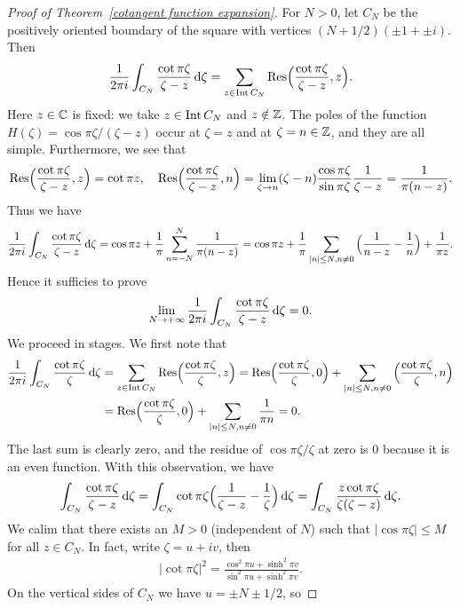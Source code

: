 \begin{proof}[Proof of Theorem~\ref{cotangent function expansion}]
For $N>0$, let $C_N$ be the positively oriented boundary of the square with vertices $(N+1/2)(\pm 1+\pm i)$. Then
\[\frac{1}{2\pi i}\int_{C_N}\frac{\cot\pi\zeta}{\zeta-z}\mathop{}\!\mathrm{d}\zeta=\sum_{z\in\mathrm{Int}\, C_N}\mathrm{Res}\Big(\frac{\cot\pi\zeta}{\zeta-z},z\Big).\]
Here $z\in\mathbb{C}$ is fixed: we take $z\in\mathrm{Int}\, C_N$ and $z\notin\mathbb{Z}$. The poles of the function $H(\zeta)=\cos\pi\zeta/(\zeta-z)$ occur at $\zeta=z$ and at $\zeta=n\in\mathbb{Z}$, and they are all simple. Furthermore, we see that
\[\mathrm{Res}\Big(\frac{\cot\pi\zeta}{\zeta-z},z\Big)=\cot\pi z,\quad \mathrm{Res}\Big(\frac{\cot\pi\zeta}{\zeta-z},n\Big)=\lim_{\zeta\to n}(\zeta-n)\frac{\cos\pi\zeta}{\sin\pi\zeta}\frac{1}{\zeta-z}=\frac{1}{\pi(n-z)}.\]
Thus we have
\[\frac{1}{2\pi i}\int_{C_N}\frac{\cot\pi\zeta}{\zeta-z}\mathop{}\!\mathrm{d}\zeta=\cos\pi z+\frac{1}{\pi}\sum_{n=-N}^{N}\frac{1}{\pi(n-z)}=\cos\pi z+\frac{1}{\pi}\sum_{|n|\leq N,n\neq 0}\Big(\frac{1}{n-z}-\frac{1}{n}\Big)+\frac{1}{\pi z}.\]
Hence it sufficies to prove
\begin{align}\label{cotangent function expansion-2}
\lim_{N\to+\infty}\frac{1}{2\pi i}\int_{C_N}\frac{\cot\pi\zeta}{\zeta-z}\mathop{}\!\mathrm{d}\zeta=0.
\end{align}
We proceed in stages. We first note that
\begin{align*}
\frac{1}{2\pi i}\int_{C_N}\frac{\cot\pi\zeta}{\zeta}\mathop{}\!\mathrm{d}\zeta&=\sum_{z\in\mathrm{Int}\, C_N}\mathrm{Res}\Big(\frac{\cot\pi\zeta}{\zeta},z\Big)=\mathrm{Res}\Big(\frac{\cot\pi\zeta}{\zeta},0\Big)+\sum_{|n|\leq N,n\neq 0}\Big(\frac{\cot\pi\zeta}{\zeta},n\Big)\\
&=\mathrm{Res}\Big(\frac{\cot\pi\zeta}{\zeta},0\Big)+\sum_{|n|\leq N,n\neq 0}\frac{1}{\pi n}=0.
\end{align*}
The last sum is clearly zero, and the residue of $\cos\pi\zeta/\zeta$ at zero is $0$ because it is an even function. With this observation, we have
\begin{align}\label{cotangent function expansion-3}
\int_{C_N}\frac{\cot\pi\zeta}{\zeta-z}\mathop{}\!\mathrm{d}\zeta=\int_{C_N}\cot\pi\zeta\Big(\frac{1}{\zeta-z}-\frac{1}{\zeta}\Big)\mathop{}\!\mathrm{d}\zeta=\int_{C_N}\frac{z\cot\pi\zeta}{\zeta(\zeta-z)}\mathop{}\!\mathrm{d}\zeta.
\end{align}
We calim that there exists an $M>0$ (independent of $N$) such that $|\cos\pi\zeta|\leq M$ for all $z\in C_N$. In fact, write $\zeta=u+iv$, then
\begin{align*}
|\cot\pi\zeta|^2=\frac{\cos^2\pi u+\sinh^2\pi v}{\sin^2\pi u+\sinh^2\pi v}.
\end{align*}
On the vertical sides of $C_N$ we have $u=\pm N\pm 1/2$, so

\end{proof}
